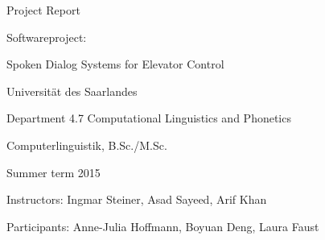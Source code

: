 
\begin{center} Project Report \end{center}
\hspace{1cm}
\begin{center} Softwareproject: \end{center}
\begin{center}Spoken Dialog Systems for Elevator Control \end{center}
\begin{center} Universität des Saarlandes \end{center}
\begin{center} Department 4.7 Computational Linguistics and Phonetics \end{center}
\begin{center} Computerlinguistik, B.Sc./M.Sc. \end{center}
\begin{center} Summer term 2015 \end{center} 

\hspace{1cm}
\begin{center}Instructors: Ingmar Steiner, Asad Sayeed, Arif Khan \end{center}

\begin{center} Participants: Anne-Julia Hoffmann, Boyuan Deng, Laura Faust \end{center}

